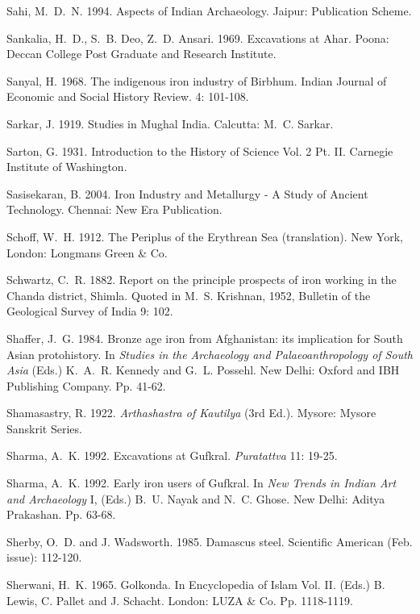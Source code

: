 \begin{thebibliography}{99}
 Sahi, M.~D.~N. 1994. Aspects of Indian Archaeology. Jaipur: Publication Scheme. 

 Sankalia, H.~D., S.~B. Deo, Z.~D. Ansari. 1969. Excavations at Ahar. Poona: Deccan College Post Graduate and Research Institute.

 Sanyal, H. 1968. The indigenous iron industry of Birbhum. Indian Journal of Economic and Social History Review. 4: 101-108. 

 Sarkar, J. 1919. Studies in Mughal India. Calcutta: M.~C. Sarkar. 

 Sarton, G. 1931. Introduction to the History of Science Vol. 2 Pt. II. Carnegie Institute of Washington.

 Sasisekaran, B. 2004. Iron Industry and Metallurgy - A Study of Ancient Technology. Chennai: New Era Publication.

 Schoff, W.~H. 1912. The Periplus of the Erythrean Sea (translation). New York, London: Longmans Green \& Co.

 Schwartz, C.~R. 1882. Report on the principle prospects of iron working in the Chanda district, Shimla. Quoted in M.~S. Krishnan, 1952, Bulletin of the Geological Survey of India 9: 102.

 Shaffer, J.~G. 1984. Bronze age iron from Afghanistan: its implication for South Asian protohistory. In \textit{Studies in the Archaeology and Palaeoanthropology of South Asia} (Eds.) K.~A.~R. Kennedy and G.~L. Possehl. New Delhi: Oxford and IBH Publishing Company. Pp. 41-62. 

 Shamasastry, R. 1922. \textit{Arthashastra of Kautilya} (3rd Ed.). Mysore: Mysore Sanskrit Series.

 Sharma, A.~K. 1992. Excavations at Gufkral. \textit{Puratattva} 11: 19-25.

 Sharma, A.~K. 1992. Early iron users of Gufkral. In \textit{New Trends in Indian Art and Archaeology} I, (Eds.) B.~U. Nayak and N.~C. Ghose. New Delhi: Aditya Prakashan. Pp. 63-68.

 Sherby, O.~D. and J. Wadsworth. 1985. Damascus steel. Scientific American (Feb. issue): 112-120.

 Sherwani, H.~K. 1965. Golkonda. In Encyclopedia of Islam Vol. II. (Eds.) B. Lewis, C. Pallet and J. Schacht. London: LUZA \& Co. Pp. 1118-1119. 


\end{thebibliography}
